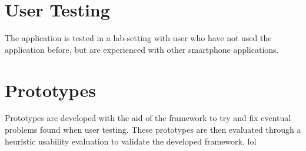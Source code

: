 \section{User Testing}
The application is tested in a lab-setting with user who have not used the application before, but are experienced with other smartphone applications. 

\section{Prototypes}
%
Prototypes are developed with the aid of the framework to try and fix eventual problems found when user testing. These prototypes are then evaluated through a heuristic usability evaluation to validate the developed framework.
lol
